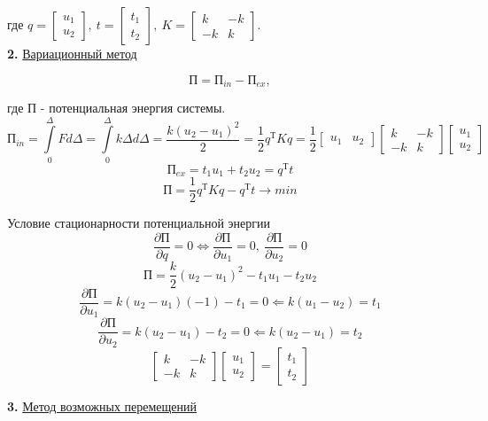 \documentclass{bmstu}
\begin{document}
	где $q = \begin{bmatrix}
		u_1 \\ u_2
	\end{bmatrix},\ t = \begin{bmatrix}
	t_1 \\ t_2
	\end{bmatrix}, \ K =	\begin{bmatrix}
	k & - k \\ -k & k
	\end{bmatrix}$.\\

\textbf{2.} \underline{Вариационный метод}

\[
\text{П} = \text{П}_{in} - \text{П}_{ex},
\]

где $\text{П}$ - потенциальная энергия системы. 
\[
\text{П}_{in} = \int\limits_0^{\Delta} Fd\Delta = \int\limits_0^{\Delta}k\Delta d\Delta = \frac{k(u_2-u_1)^2}{2}=\frac{1}{2}q^{\text{Т}}Kq=\frac{1}{2}\begin{bmatrix}
		u_1 & u_2
	\end{bmatrix}\begin{bmatrix}
	k & - k \\ -k & k
	\end{bmatrix}
	\begin{bmatrix}
	u_1 \\ u_2
	\end{bmatrix}
\]
\[
\text{П}_{ex} =  t_1 u_1 +t_2 u_2 = q^{\text{Т}}t
\]
\[
\text{П} = \frac{1}{2}q^{\text{Т}}Kq-q^{\text{Т}}t\rightarrow min
\]

Условие стационарности потенциальной энергии
\[
\frac{\partial \text{П}}{\partial q}=0 \Leftrightarrow \frac{\partial \text{П}}{\partial u_1}=0, \ \frac{\partial \text{П}}{\partial u_2}=0
\]
\[
\text{П}=\frac{k}{2}(u_2-u_1)^2-t_1u_1-t_2u_2
\]
\[
\frac{\partial \text{П}}{\partial u_1}=k(u_2-u_1)(-1)-t_1=0 \Leftarrow k(u_1-u_2)= t_1
\]
\[
\frac{\partial \text{П}}{\partial u_2}=k(u_2-u_1)-t_2=0 \Leftarrow k(u_2-u_1)= t_2
\]
\[
\begin{bmatrix}
	k & - k \\ -k & k
\end{bmatrix}
\begin{bmatrix}
	u_1 \\ u_2
\end{bmatrix} = \begin{bmatrix}
	t_1 \\ t_2
\end{bmatrix} 
\]

\textbf{3.} \underline{Метод возможных перемещений}
\end{document}
